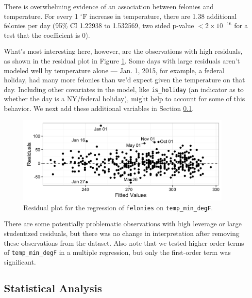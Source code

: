 \documentclass[11pt,notitlepage]{article}
\newcommand{\degf}{^\circ\text{F}}
\begin{document}

There is overwhelming evidence of an association between felonies and temperature. For every 1 $\degf$ increase in temperature, there are 1.38 additional felonies per day (95\% CI 1.22938 to 1.532569, two sided p-value $<2\times10^{-16}$ for a test that the coefficient is 0).

What's most interesting here, however, are the observations with high residuals, as shown in the residual plot in Figure \ref{fig:lm1Residuals}. Some days with large residuals aren't modeled well by temperature alone --- Jan. 1, 2015, for example, a federal holiday, had many more felonies than we'd expect given the temperature on that day. Including other covariates in the model, like \texttt{is_holiday} (an indicator as to whether the day is a NY/federal holiday), might help to account for some of this behavior. We next add these additional variables in Section \ref{sec:modelFeloniesMultipleRegression}.

\begin{figure}[!h]
	\centering
	\captionsetup{width=0.9\textwidth}
	\includegraphics[width=4.25in]{figures/lm1Residuals.png}
	\vspace*{-3mm}
	\caption{Residual plot for the regression of \texttt{felonies} on \texttt{temp_min_degF}.}
	\label{fig:lm1Residuals}
	\vspace*{-3mm}
\end{figure}


There are some potentially problematic observations with high leverage or large studentized residuals, but there was no change in interpretation after removing these observations from the dataset. Also note that we tested higher order terms of \texttt{temp_min_degF} in a multiple regression, but only the first-order term was significant.


\subsection{Statistical Analysis}
\label{sec:modelFeloniesMultipleRegression}
\end{document}
